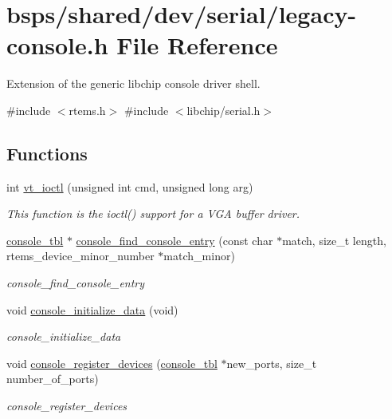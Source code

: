 \hypertarget{legacy-console_8h}{}\section{bsps/shared/dev/serial/legacy-\/console.h File Reference}
\label{legacy-console_8h}


Extension of the generic libchip console driver shell.  


{\ttfamily \#include $<$rtems.\+h$>$}\newline
{\ttfamily \#include $<$libchip/serial.\+h$>$}\newline
\subsection*{Functions}
\begin{DoxyCompactItemize}
\item 
int \mbox{\hyperlink{legacy-console_8h_a4532c63cb4236c50e2a5c3aeeb566d1c}{vt\+\_\+ioctl}} (unsigned int cmd, unsigned long arg)
\begin{DoxyCompactList}\small\item\em This function is the ioctl() support for a V\+GA buffer driver. \end{DoxyCompactList}\item 
\mbox{\hyperlink{struct__console__tbl}{console\+\_\+tbl}} $\ast$ \mbox{\hyperlink{legacy-console_8h_a504c826507edc4631251f6e2ccbeac8b}{console\+\_\+find\+\_\+console\+\_\+entry}} (const char $\ast$match, size\+\_\+t length, rtems\+\_\+device\+\_\+minor\+\_\+number $\ast$match\+\_\+minor)
\begin{DoxyCompactList}\small\item\em console\+\_\+find\+\_\+console\+\_\+entry \end{DoxyCompactList}\item 
void \mbox{\hyperlink{legacy-console_8h_a876e108a27082ad7b2a68f26dd37b673}{console\+\_\+initialize\+\_\+data}} (void)
\begin{DoxyCompactList}\small\item\em console\+\_\+initialize\+\_\+data \end{DoxyCompactList}\item 
void \mbox{\hyperlink{legacy-console_8h_ab7b7632a5db0bff08d69845c22ec1d56}{console\+\_\+register\+\_\+devices}} (\mbox{\hyperlink{struct__console__tbl}{console\+\_\+tbl}} $\ast$new\+\_\+ports, size\+\_\+t number\+\_\+of\+\_\+ports)
\begin{DoxyCompactList}\small\item\em console\+\_\+register\+\_\+devices \end{DoxyCompactList}\end{DoxyCompactItemize}

